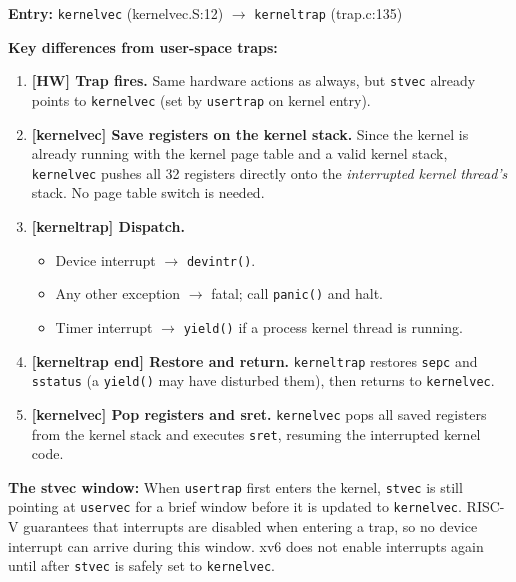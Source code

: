 \documentclass[11pt, a4paper]{article}
\begin{document}
\begin{tcolorbox}[lifecycle, title={Kernel-Space Trap Lifecycle}]

\textbf{Entry:} \lstinline|kernelvec| (kernelvec.S:12) $\to$ \lstinline|kerneltrap| (trap.c:135)

\medskip
\textbf{Key differences from user-space traps:}

\begin{enumerate}[leftmargin=1.8em, itemsep=0.3em]
  \item \textbf{[HW] Trap fires.} Same hardware actions as always, but \lstinline|stvec| already points to \lstinline|kernelvec| (set by \lstinline|usertrap| on kernel entry).

  \item \textbf{[kernelvec] Save registers on the kernel stack.}
        Since the kernel is already running with the kernel page table and a valid kernel stack, \lstinline|kernelvec| pushes all 32 registers directly onto the \emph{interrupted kernel thread's} stack. No page table switch is needed.

  \item \textbf{[kerneltrap] Dispatch.}
        \begin{itemize}[leftmargin=1.5em]
          \item Device interrupt $\to$ \lstinline|devintr()|.
          \item Any other exception $\to$ fatal; call \lstinline|panic()| and halt.
          \item Timer interrupt $\to$ \lstinline|yield()| if a process kernel thread is running.
        \end{itemize}

  \item \textbf{[kerneltrap end] Restore and return.}
        \lstinline|kerneltrap| restores \lstinline|sepc| and \lstinline|sstatus| (a \lstinline|yield()| may have disturbed them), then returns to \lstinline|kernelvec|.

  \item \textbf{[kernelvec] Pop registers and sret.}
        \lstinline|kernelvec| pops all saved registers from the kernel stack and executes \lstinline|sret|, resuming the interrupted kernel code.
\end{enumerate}
\end{tcolorbox}

\begin{tcolorbox}[impldetail]
\textbf{The stvec window:} When \lstinline|usertrap| first enters the kernel, \lstinline|stvec| is still pointing at \lstinline|uservec| for a brief window before it is updated to \lstinline|kernelvec|. RISC-V guarantees that interrupts are disabled when entering a trap, so no device interrupt can arrive during this window. xv6 does not enable interrupts again until after \lstinline|stvec| is safely set to \lstinline|kernelvec|.
\end{tcolorbox}
\end{document}
